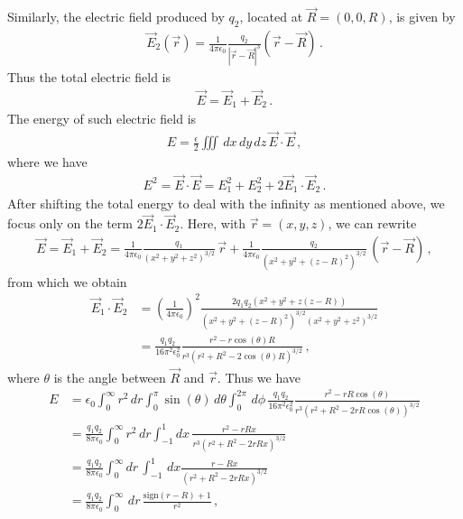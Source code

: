 \documentclass[11pt, onesided]{book}
\theoremstyle{break}
\theoremstyle{break}
\begin{document}
Similarly, the electric field produced by $q_2$, located at $\vec{R}=(0,0,R)$, is given by
\begin{align*}
\vec{E}_2(\vec{r}) = \frac{1}{4\pi \epsilon_0}\frac{q_2}{|\vec{r} - \vec{R}|^3} (\vec{r} - \vec{R})\,.
\end{align*}
Thus the total electric field is
\begin{align*}
\vec{E} = \vec{E}_1 + \vec{E}_2\,.
\end{align*}
The energy of such electric field is
\begin{align*}
E = \frac{\epsilon}{2}\iiint \, dx\,dy\,dz \, \vec{E}\cdot \vec{E}\,,
\end{align*}
where we have
\begin{align*}
E^2 = \vec{E}\cdot \vec{E}  = E_1^2 + E_2^2 + 2\vec{E}_1 \cdot \vec{E}_2\,.
\end{align*}
After shifting the total energy to deal with the infinity as mentioned above, we focus only on the term $ 2\vec{E}_1 \cdot \vec{E}_2$. Here, with $\vec{r} = (x,y,z)$, we can rewrite
\begin{align*}
\vec{E} = \vec{E}_1 + \vec{E}_2 
=
\frac{1}{4\pi \epsilon_0}\frac{q_1}{(x^2 + y^2 + z^2)^{3/2}}\, \vec{r} + \frac{1}{4\pi \epsilon_0} \frac{q_2}{(x^2 + y^2 + (z-R)^2)^{3/2}}\,(\vec{r} - \vec{R})\,,
\end{align*} 
from which we obtain
\begin{align*}
\vec{E}_1 \cdot \vec{E}_2 
&= 
\left(\frac{1}{4\pi \epsilon_0}\right)^2
\frac{2q_1q_2(x^2 + y^2 + z(z-R))}{(x^2 + y^2 + (z-R)^2)^{3/2}(x^2 + y^2 + z^2)^{3/2}}\\
&= \frac{q_1q_2}{16\pi^2 \epsilon_0^2}\frac{r^2 - r\cos(\theta) R}{r^3(r^2 + R^2 - 2\cos(\theta)R)^{3/2}}\,,
\end{align*}
where $\theta$ is the angle between $\vec{R}$ and $\vec{r}$. Thus we have
\begin{align*}
E&= \epsilon_0 \int_0^\infty r^2 \, dr \int_0^\pi \sin(\theta) \, d\theta \int_0^{2\pi}\, d\phi \, \frac{q_1q_2}{16\pi^2 \epsilon_0^2}
\frac{r^2 - rR\cos(\theta)}{r^3(r^2 + R^2 - 2rR\cos(\theta))^{3/2}}\\
&= \frac{q_1q_2}{8\pi \epsilon_0}\int_0^\infty r^2\, dr \int_{-1}^1 dx\,\frac{r^2 - rRx}{r^3(r^2 + R^2 - 2rRx)^{3/2}}\\
&= \frac{q_1q_2}{8\pi \epsilon_0}\int_0^\infty dr\, \int_{-1}^{1}\, dx \frac{r-Rx}{(r^2 + R^2 - 2rRx)^{3/2}}\\
&= \frac{q_1q_2}{8\pi \epsilon_0}\int_0^\infty \, dr\,\frac{\text{sign}(r-R)+1}{r^2}\,,
\end{align*}
\end{document}
